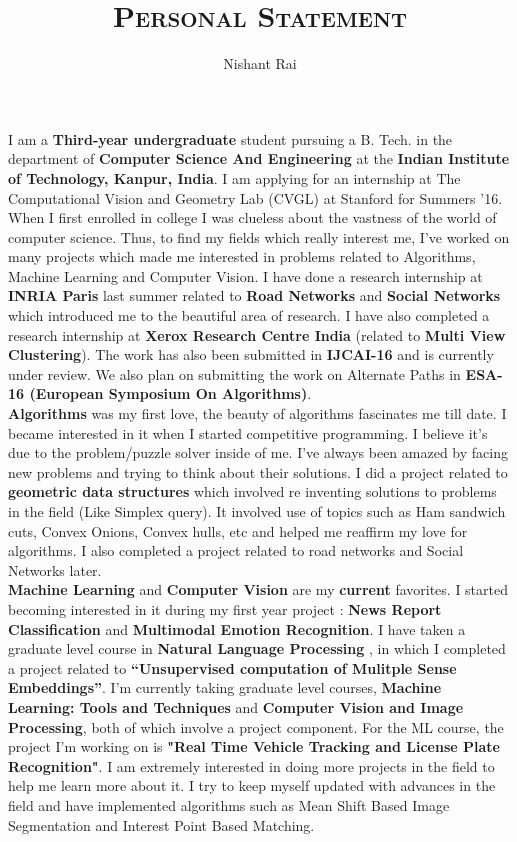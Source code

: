 \documentclass[a4paper]{article}
\title{\huge{\textsc{Personal Statement}}}
\author{Nishant Rai}
\date{}
\begin{document}
	\maketitle	
	
	I am a \textbf{Third-year undergraduate} student pursuing a B. Tech. in the department of \textbf{Computer Science And Engineering} at the \textbf{Indian Institute of Technology, Kanpur, India}. I am applying for an internship at The Computational Vision and Geometry Lab (CVGL) at Stanford for Summers '16.\\

When I first enrolled in college I was clueless about the vastness of the world of computer science. Thus, to find my fields which really interest me, I've worked on many projects which made me interested in problems related to Algorithms, Machine Learning and Computer Vision. I have done a research internship at \textbf{INRIA Paris} last summer related to \textbf{Road Networks} and \textbf{Social Networks} which introduced me to the beautiful area of research. I have also completed a research internship at \textbf{Xerox Research Centre India} (related to \textbf{Multi View Clustering}). The work has also been submitted in \textbf{IJCAI-16} and is currently under review. We also plan on submitting the work on Alternate Paths in \textbf{ESA-16 (European Symposium On Algorithms)}.\\

\textbf{Algorithms} was my first love, the beauty of algorithms fascinates me till date. I became interested in it when I started competitive programming. I believe it's due to the problem/puzzle solver inside of me. I've always been amazed by facing new problems and trying to think about their solutions. I did a project related to \textbf{geometric data structures} which involved re inventing solutions to problems in the field (Like Simplex query). It involved use of topics such as Ham sandwich cuts, Convex Onions, Convex hulls, etc and helped me reaffirm my love for algorithms. I also completed a project related to road networks and Social Networks later.\\

\textbf{Machine Learning} and \textbf{Computer Vision} are my \textbf{current} favorites. I started becoming interested in it during my first year project : \textbf{News Report Classification} and \textbf{Multimodal Emotion Recognition}. I have taken a graduate level course in \textbf{Natural Language Processing} , in which I completed a project related to \textbf{“Unsupervised computation of Mulitple Sense Embeddings”}. I'm currently taking graduate level courses, \textbf{Machine Learning: Tools and Techniques} and \textbf{Computer Vision and Image Processing}, both of which involve a project component. For the ML course, the project I'm working on is \textbf{"Real Time Vehicle Tracking and License Plate Recognition"}. I am extremely interested in doing more projects in the field to help me learn more about it. I try to keep myself updated with advances in the field and have implemented algorithms such as Mean Shift Based Image Segmentation and Interest Point Based Matching.\\
\end{document}

